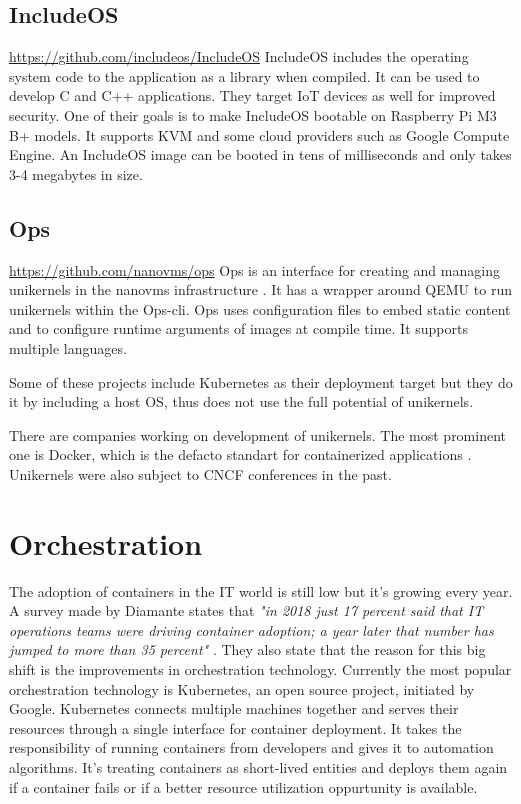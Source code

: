 \subsection*{IncludeOS}
\url{https://github.com/includeos/IncludeOS} \cite{7396164}
IncludeOS includes the operating system code to the application as a library when compiled. It can be used to develop C and C++ applications. They target IoT devices as well for improved security. One of their goals is to make IncludeOS bootable on Raspberry Pi M3 B+ models. It supports KVM and some cloud providers such as Google Compute Engine. An IncludeOS image can be booted in tens of milliseconds and only takes 3-4 megabytes in size.

\subsection*{Ops}
\url{https://github.com/nanovms/ops}
  Ops is an interface for creating and managing unikernels in the nanovms infrastructure \cite{nanovms}. It has a wrapper around QEMU \cite{qemu} to run unikernels within the Ops-cli. Ops uses configuration files to embed static content and to configure runtime arguments of images at compile time. It supports multiple languages.
\newline

Some of these projects include Kubernetes as their deployment target but they do it by including a host OS, thus does not use the full potential of unikernels.

There are companies working on development of unikernels. The most prominent one is Docker, which is the defacto standart for containerized applications \cite{francia_2016}. Unikernels were also subject to CNCF conferences in the past.

\section{Orchestration}
The adoption of containers in the IT world is still low but it's growing every year. A survey made by Diamante states that \textit{"in 2018 just 17 percent said that IT operations teams were driving container adoption; a year later that number has jumped to more than 35 percent"} \cite{diamante}. They also state that the reason for this big shift is the improvements in orchestration technology. Currently the most popular orchestration technology is Kubernetes, an open source project, initiated by Google. Kubernetes connects multiple machines together and serves their resources through a single interface for container deployment. It takes the responsibility of running containers from developers and gives it to automation algorithms. It's treating containers as short-lived entities and deploys them again if a container fails or if a better resource utilization oppurtunity is available.

